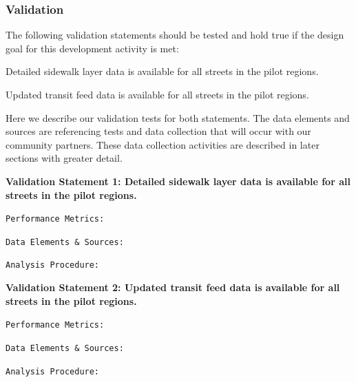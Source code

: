 \subsubsection{Validation}

The following validation statements should be tested and hold true if the design goal for this development activity is met: 

Detailed sidewalk layer data is available for all streets in the pilot regions.

Updated transit feed data is available for all streets in the pilot regions.

Here we describe our validation tests for both statements. The data elements and sources are referencing tests and data collection that will occur with our community partners. These data collection activities are described in later sections with greater detail.

\textbf{Validation Statement 1:
Detailed sidewalk layer data is available for all streets in the pilot regions.}

\texttt{Performance Metrics:} 

\texttt{Data Elements \& Sources:}

\texttt{Analysis Procedure:}

\textbf{Validation Statement 2:
Updated transit feed data is available for all streets in the pilot regions.}


\texttt{Performance Metrics:} 

\texttt{Data Elements \& Sources:}

\texttt{Analysis Procedure:}
